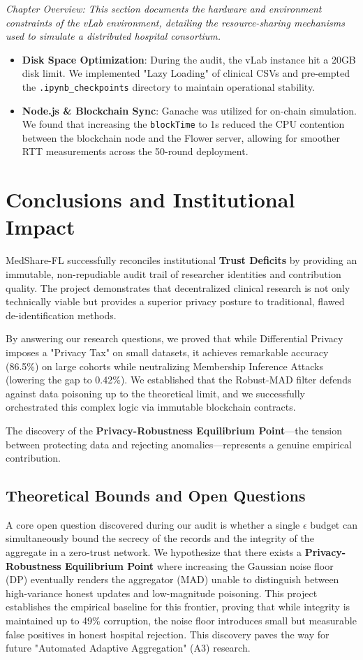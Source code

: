 \documentclass[10pt, a4paper, twocolumn]{article}
\begin{document}
\textit{Chapter Overview: This section documents the hardware and environment constraints of the vLab environment, detailing the resource-sharing mechanisms used to simulate a distributed hospital consortium.}

\begin{itemize}
    \item \textbf{Disk Space Optimization}: During the audit, the vLab instance hit a 20GB disk limit. We implemented "Lazy Loading" of clinical CSVs and pre-empted the \texttt{.ipynb\_checkpoints} directory to maintain operational stability.
    \item \textbf{Node.js \& Blockchain Sync}: Ganache was utilized for on-chain simulation. We found that increasing the \texttt{blockTime} to 1s reduced the CPU contention between the blockchain node and the Flower server, allowing for smoother RTT measurements across the 50-round deployment.
\end{itemize}

\section{Conclusions and Institutional Impact}
MedShare-FL successfully reconciles institutional \textbf{Trust Deficits} by providing an immutable, non-repudiable audit trail of researcher identities and contribution quality. The project demonstrates that decentralized clinical research is not only technically viable but provides a superior privacy posture to traditional, flawed de-identification methods.

By answering our research questions, we proved that while Differential Privacy imposes a "Privacy Tax" on small datasets, it achieves remarkable accuracy (86.5\%) on large cohorts while neutralizing Membership Inference Attacks (lowering the gap to 0.42\%). We established that the Robust-MAD filter defends against data poisoning up to the theoretical limit, and we successfully orchestrated this complex logic via immutable blockchain contracts.

The discovery of the \textbf{Privacy-Robustness Equilibrium Point}—the tension between protecting data and rejecting anomalies—represents a genuine empirical contribution.

\subsection{Theoretical Bounds and Open Questions}
A core open question discovered during our audit is whether a single $\epsilon$ budget can simultaneously bound the secrecy of the records and the integrity of the aggregate in a zero-trust network. We hypothesize that there exists a \textbf{Privacy-Robustness Equilibrium Point} where increasing the Gaussian noise floor (DP) eventually renders the aggregator (MAD) unable to distinguish between high-variance honest updates and low-magnitude poisoning. This project establishes the empirical baseline for this frontier, proving that while integrity is maintained up to 49\% corruption, the noise floor introduces small but measurable false positives in honest hospital rejection. This discovery paves the way for future "Automated Adaptive Aggregation" (A3) research.
\end{document}
